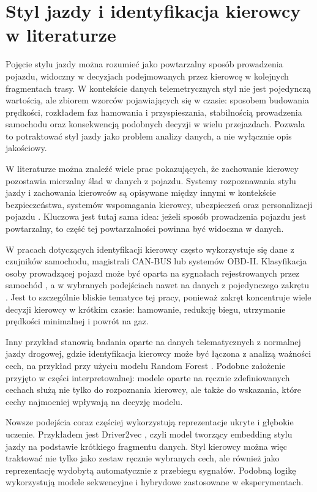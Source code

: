 \documentclass[printmode,pl]{mgr}
\begin{document}
\section{Styl jazdy i identyfikacja kierowcy w literaturze}

Pojęcie stylu jazdy można rozumieć jako powtarzalny sposób prowadzenia pojazdu, widoczny w decyzjach podejmowanych przez kierowcę w kolejnych fragmentach trasy. W kontekście danych telemetrycznych styl nie jest pojedynczą wartością, ale zbiorem wzorców pojawiających się w czasie: sposobem budowania prędkości, rozkładem faz hamowania i przyspieszania, stabilnością prowadzenia samochodu oraz konsekwencją podobnych decyzji w wielu przejazdach. Pozwala to potraktować styl jazdy jako problem analizy danych, a nie wyłącznie opis jakościowy.

W literaturze można znaleźć wiele prac pokazujących, że zachowanie kierowcy pozostawia mierzalny ślad w danych z pojazdu. Systemy rozpoznawania stylu jazdy i zachowania kierowców są opisywane między innymi w kontekście bezpieczeństwa, systemów wspomagania kierowcy, ubezpieczeń oraz personalizacji pojazdu \cite{driving_style_review}. Kluczowa jest tutaj sama idea: jeżeli sposób prowadzenia pojazdu jest powtarzalny, to część tej powtarzalności powinna być widoczna w danych.

W pracach dotyczących identyfikacji kierowcy często wykorzystuje się dane z czujników samochodu, magistrali CAN-BUS lub systemów OBD-II. Klasyfikacja osoby prowadzącej pojazd może być oparta na sygnałach rejestrowanych przez samochód \cite{driver_can_identification}, a w wybranych podejściach nawet na danych z pojedynczego zakrętu \cite{hallac2016}. Jest to szczególnie bliskie tematyce tej pracy, ponieważ zakręt koncentruje wiele decyzji kierowcy w krótkim czasie: hamowanie, redukcję biegu, utrzymanie prędkości minimalnej i powrót na gaz.

Inny przykład stanowią badania oparte na danych telematycznych z normalnej jazdy drogowej, gdzie identyfikacja kierowcy może być łączona z analizą ważności cech, na przykład przy użyciu modelu Random Forest \cite{wang2017}. Podobne założenie przyjęto w części interpretowalnej: modele oparte na ręcznie zdefiniowanych cechach służą nie tylko do rozpoznania kierowcy, ale także do wskazania, które cechy najmocniej wpływają na decyzję modelu.

Nowsze podejścia coraz częściej wykorzystują reprezentacje ukryte i głębokie uczenie. Przykładem jest Driver2vec \cite{driver2vec}, czyli model tworzący embedding stylu jazdy na podstawie krótkiego fragmentu danych. Styl kierowcy można więc traktować nie tylko jako zestaw ręcznie wybranych cech, ale również jako reprezentację wydobytą automatycznie z przebiegu sygnałów. Podobną logikę wykorzystują modele sekwencyjne i hybrydowe zastosowane w eksperymentach.
\end{document}
